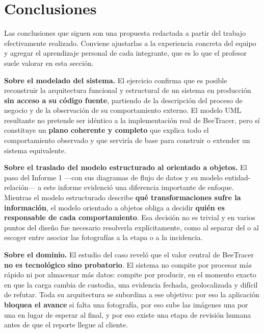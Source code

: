 \chapter{Conclusiones}
\label{cap:conclusiones}

\begin{pendiente}
Las conclusiones que siguen son una propuesta redactada a partir del trabajo efectivamente
realizado. Conviene ajustarlas a la experiencia concreta del equipo y agregar el aprendizaje
personal de cada integrante, que es lo que el profesor suele valorar en esta sección.
\end{pendiente}

\textbf{Sobre el modelado del sistema.} El ejercicio confirma que es posible reconstruir la
arquitectura funcional y estructural de un sistema en producción \textbf{sin acceso a su código
fuente}, partiendo de la descripción del proceso de negocio y de la observación de su
comportamiento externo. El modelo UML resultante no pretende ser idéntico a la implementación real
de BeeTracer, pero sí constituye un \textbf{plano coherente y completo} que explica todo el
comportamiento observado y que serviría de base para construir o extender un sistema equivalente.

\textbf{Sobre el traslado del modelo estructurado al orientado a objetos.} El paso del Informe 1
---con sus diagramas de flujo de datos y su modelo entidad-relación--- a este informe evidenció una
diferencia importante de enfoque. Mientras el modelo estructurado describe \textbf{qué
transformaciones sufre la información}, el modelo orientado a objetos obliga a decidir
\textbf{quién es responsable de cada comportamiento}. Esa decisión no es trivial y en varios puntos
del diseño fue necesario resolverla explícitamente, como al separar 
del  o al escoger entre asociar las fotografías a la etapa o a la incidencia.

\textbf{Sobre el dominio.} El estudio del caso reveló que el valor central de BeeTracer \textbf{no
es tecnológico sino probatorio}. El sistema no compite por procesar más rápido ni por almacenar más
datos: compite por producir, en el momento exacto en que la carga cambia de custodia, una evidencia
fechada, geolocalizada y difícil de refutar. Toda su arquitectura se subordina a ese objetivo: por
eso la aplicación \textbf{bloquea el avance} si falta una fotografía, por eso sube las imágenes una
por una en lugar de esperar al final, y por eso existe una etapa de revisión humana antes de que el
reporte llegue al cliente.

